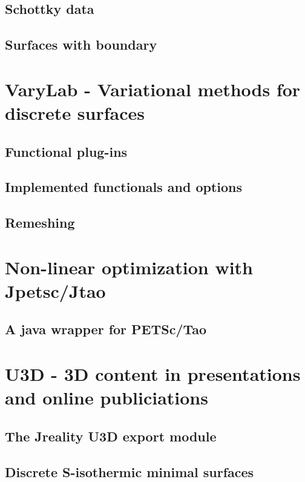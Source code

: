 \subsection{Schottky data}
\subsection{Surfaces with boundary}

\section{{\sc VaryLab} - Variational methods for discrete surfaces}
\label{sec:varylab}
\subsection{Functional plug-ins}
\subsection{Implemented functionals and options}
\subsection{Remeshing}

\section{Non-linear optimization with {\sc Jpetsc/Jtao}}
\label{sec:jpetsctao}
\subsection{A java wrapper for {\sc PETSc/Tao}}

\section{{\sc U3D} - 3D content in presentations and online publiciations}
\label{sec:u3d}
\subsection{The {\sc Jreality} U3D export module}
\subsection{Discrete S-isothermic minimal surfaces}


